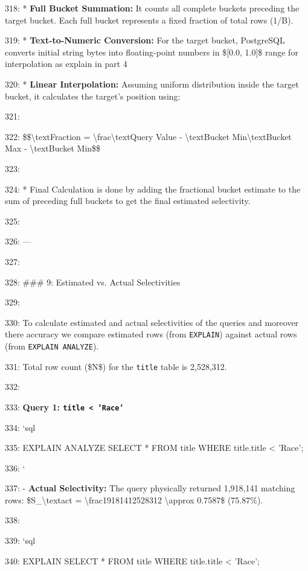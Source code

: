 \documentclass[11pt,a4paper]{article}
\begin{document}
{318: * \textbf{Full Bucket Summation:} It counts all complete buckets preceding the target bucket. Each full bucket represents a fixed fraction of total rows (1/B).

319: * \textbf{Text-to-Numeric Conversion:} For the target bucket, PostgreSQL converts initial string bytes into floating-point numbers in \$[0.0, 1.0]\$ range for interpolation as explain in part 4

320: * \textbf{Linear Interpolation:} Assuming uniform distribution inside the target bucket, it calculates the target's position using:

321:

322: \$\$\textbackslash{}text{Fraction} = \textbackslash{}frac{\textbackslash{}text{Query Value} - \textbackslash{}text{Bucket Min}}{\textbackslash{}text{Bucket Max} - \textbackslash{}text{Bucket Min}}\$\$

323:

324: *   Final Calculation is done by adding the fractional bucket estimate to the sum of preceding full buckets to get the final estimated selectivity.

325:

326: ---

327:

328: \#\#\# 9: Estimated vs. Actual Selectivities

329:

330: To calculate estimated and actual selectivities of the queries and moreover there accuracy we compare estimated rows (from \texttt{EXPLAIN}) against actual rows (from \texttt{EXPLAIN ANALYZE}).

331: Total row count (\$N\$) for the \texttt{title} table is 2,528,312.

332:

333: \textbf{Query 1: \texttt{title < 'Race'}}

334: \texttt{}`sql

335: EXPLAIN ANALYZE SELECT * FROM title WHERE title.title < 'Race';

336: \texttt{}`

337: - \textbf{Actual Selectivity:} The query physically returned 1,918,141 matching rows: \$S\_{\textbackslash{}text{act}} = \textbackslash{}frac{1918141}{2528312} \textbackslash{}approx 0.7587\$ (75.87\%).

338:

339: \texttt{}`sql

340: EXPLAIN SELECT * FROM title WHERE title.title < 'Race';

}
\end{document}
